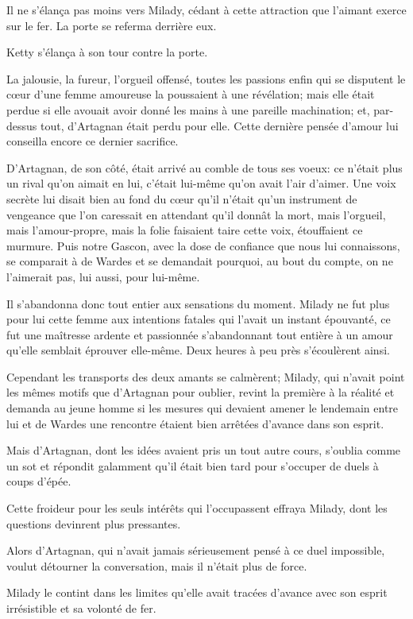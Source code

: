 Il ne s'élança pas moins vers Milady, cédant à cette attraction que l'aimant exerce sur le fer. La porte se referma derrière eux. 

Ketty s'élança à son tour contre la porte. 

La jalousie, la fureur, l'orgueil offensé, toutes les passions enfin qui se disputent le cœur d'une femme amoureuse la poussaient à une révélation; mais elle était perdue si elle avouait avoir donné les mains à une pareille machination; et, par-dessus tout, d'Artagnan était perdu pour elle. Cette dernière pensée d'amour lui conseilla encore ce dernier sacrifice. 

D'Artagnan, de son côté, était arrivé au comble de tous ses voeux: ce n'était plus un rival qu'on aimait en lui, c'était lui-même qu'on avait l'air d'aimer. Une voix secrète lui disait bien au fond du cœur qu'il n'était qu'un instrument de vengeance que l'on caressait en attendant qu'il donnât la mort, mais l'orgueil, mais l'amour-propre, mais la folie faisaient taire cette voix, étouffaient ce murmure. Puis notre Gascon, avec la dose de confiance que nous lui connaissons, se comparait à de Wardes et se demandait pourquoi, au bout du compte, on ne l'aimerait pas, lui aussi, pour lui-même. 

Il s'abandonna donc tout entier aux sensations du moment. Milady ne fut plus pour lui cette femme aux intentions fatales qui l'avait un instant épouvanté, ce fut une maîtresse ardente et passionnée s'abandonnant tout entière à un amour qu'elle semblait éprouver elle-même. Deux heures à peu près s'écoulèrent ainsi. 

Cependant les transports des deux amants se calmèrent; Milady, qui n'avait point les mêmes motifs que d'Artagnan pour oublier, revint la première à la réalité et demanda au jeune homme si les mesures qui devaient amener le lendemain entre lui et de Wardes une rencontre étaient bien arrêtées d'avance dans son esprit. 

Mais d'Artagnan, dont les idées avaient pris un tout autre cours, s'oublia comme un sot et répondit galamment qu'il était bien tard pour s'occuper de duels à coups d'épée. 

Cette froideur pour les seuls intérêts qui l'occupassent effraya Milady, dont les questions devinrent plus pressantes. 

Alors d'Artagnan, qui n'avait jamais sérieusement pensé à ce duel impossible, voulut détourner la conversation, mais il n'était plus de force. 

Milady le contint dans les limites qu'elle avait tracées d'avance avec son esprit irrésistible et sa volonté de fer. 

